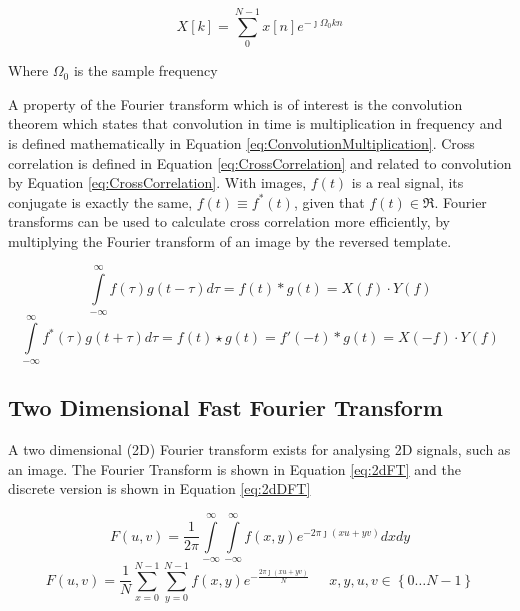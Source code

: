 \begin{equation}\label{eq:DFT}
X[k] = \sum\limits_{0}^{N-1}x[n]e^{-\jmath \Omega_0 kn}
\end{equation}
\begin{center}
Where $\Omega_0$ is the sample frequency
\end{center}

A property of the Fourier transform which is of interest is the convolution theorem which states that convolution in time is multiplication in frequency and is defined mathematically in Equation \eqref{eq:ConvolutionMultiplication}. Cross correlation is defined in Equation \eqref{eq:CrossCorrelation} and related to convolution by Equation \eqref{eq:CrossCorrelation}. With images, $f(t)$ is a real signal, its conjugate is exactly the same, $f(t) \equiv f^*(t)$, given that $f(t) \in \Re$. Fourier transforms can be used to calculate cross correlation more efficiently, by multiplying the Fourier transform of an image by the reversed template.%


\begin{equation}\label{eq:ConvolutionMultiplication}
\int\limits_{-\infty}^{\infty}f(\tau)g(t-\tau)d\tau = f(t) \ast g(t) = X(f)\cdot Y(f)
\end{equation}
\begin{equation}\label{eq:CrossCorrelation}
\int\limits_{-\infty}^{\infty}f^*(\tau)g(t+\tau)d\tau = f(t) \star g(t) = f'(-t) \ast g(t) = X(-f)\cdot Y(f)
\end{equation}


\subsection{Two Dimensional Fast Fourier Transform}
A two dimensional (2D) Fourier transform exists for analysing 2D signals, such as an image. The Fourier Transform is shown in Equation \eqref{eq:2dFT} and the discrete version is shown in Equation \eqref{eq:2dDFT}

\begin{equation}\label{eq:2dFT}
F(u,v) = \frac{1}{2\pi}\int\limits_{-\infty}^{\infty}\int\limits_{-\infty}^{\infty}f(x,y)e^{-2\pi\jmath (xu+yv)}dxdy
\end{equation}
\begin{equation}\label{eq:2dDFT}
F(u,v) = \frac{1}{N} \sum\limits_{x=0}^{N-1}\sum\limits_{y=0}^{N-1}f(x,y)e^{-\frac{2\pi\jmath (xu+yv)}{N}} \; \; \; \; \; x,y,u,v \in \left\lbrace 0\dots N-1\right\rbrace
\end{equation}

